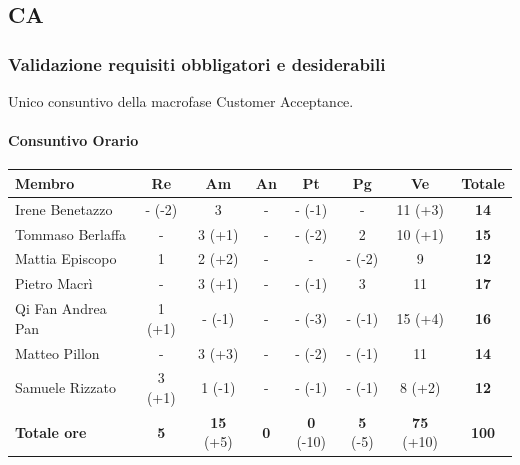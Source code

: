 \subsection{CA}
\subsubsection{Validazione requisiti obbligatori e desiderabili}
Unico consuntivo della macrofase Customer Acceptance.
\paragraph{Consuntivo Orario}
\begin{center}
	\renewcommand{\arraystretch}{1.8} %
	\begin{tabular}{ |m{8em}|c|c|c|c|c|c|c| }
	\hline
	\textbf{Membro} & \textbf{Re} & \textbf{Am} &  \textbf{An} &  \textbf{Pt} &  \textbf{Pg} &  \textbf{Ve} &  \textbf{Totale}\\
    \hline
    Irene Benetazzo   & - (-2) & 3 & - & - (-1) & - & 11 (+3) & \textbf{14} \\
    \hline
    Tommaso Berlaffa  & - & 3 (+1) & - & - (-2) & 2 & 10 (+1) & \textbf{15} \\
    \hline
    Mattia Episcopo   & 1 & 2 (+2) & - & - & - (-2) & 9 & \textbf{12}  \\
    \hline
    Pietro Macrì      & - & 3 (+1) & - & - (-1) & 3 & 11 & \textbf{17} \\
    \hline
    Qi Fan Andrea Pan & 1 (+1) & - (-1) & - & - (-3) & - (-1) & 15 (+4) & \textbf{16} \\
    \hline
    Matteo Pillon     & - & 3 (+3) & - & - (-2) & - (-1) & 11 & \textbf{14} \\
    \hline
    Samuele Rizzato   & 3 (+1) & 1 (-1) & - & - (-1) & - (-1) & 8 (+2) & \textbf{12} \\
    \hline
    \textbf{Totale ore} & \textbf{5} & \textbf{15} (+5) & \textbf{0} &  \textbf{0} (-10) &  \textbf{5} (-5) &  \textbf{75} (+10) &  \textbf{100}\\
    \hline
	\end{tabular}
\end{center}

